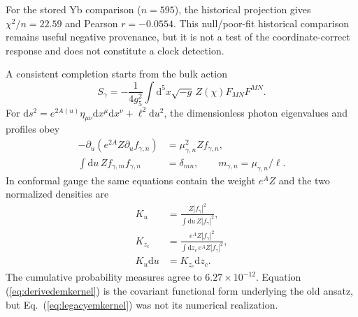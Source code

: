 \documentclass[10pt]{article}
\newcommand{\dd}{\mathrm{d}}
\begin{document}
For the stored Yb comparison ($n=595$), the historical projection gives
$\chi^2/n=22.59$ and Pearson $r=-0.0554$.  This null/poor-fit historical
comparison remains useful negative provenance, but it is not a test of the
coordinate-correct response and does not constitute a clock detection.

A consistent completion starts from the bulk action
\begin{equation}
 S_\gamma=-\frac{1}{4g_5^2}\int\dd^5x\sqrt{-g}\,
 Z(\chi)F_{MN}F^{MN}.
 \label{eq:bulkmaxwell}
\end{equation}
For
$\dd s^2=e^{2A(u)}\eta_{\mu\nu}\dd x^\mu\dd x^\nu+\ell^2\dd u^2$,
the dimensionless photon eigenvalues and profiles obey
\begin{align}
 -\partial_u(e^{2A}Z\partial_u f_{\gamma,n})
   &=\mu_{\gamma,n}^2Zf_{\gamma,n},\nonumber\\
 \int\dd u\,Zf_{\gamma,m}f_{\gamma,n}&=\delta_{mn},
 \qquad m_{\gamma,n}=\mu_{\gamma,n}/\ell .
 \label{eq:photonSL}
\end{align}
In conformal gauge the same equations contain the weight $e^AZ$ and the two
normalized densities are
\begin{align}
 K_u&=\frac{Z|f_\gamma|^2}{\int\dd u\,Z|f_\gamma|^2},\nonumber\\
 K_{z_c}&=\frac{e^AZ|f_\gamma|^2}
 {\int\dd z_c\,e^AZ|f_\gamma|^2},\nonumber\\
 K_u\dd u&=K_{z_c}\dd z_c .
 \label{eq:derivedemkernel}
\end{align}
The cumulative probability measures agree to $6.27\times10^{-12}$.  Equation
(\ref{eq:derivedemkernel}) is the covariant functional form underlying the
old ansatz, but Eq.~(\ref{eq:legacyemkernel}) was not its numerical realization.
\end{document}
